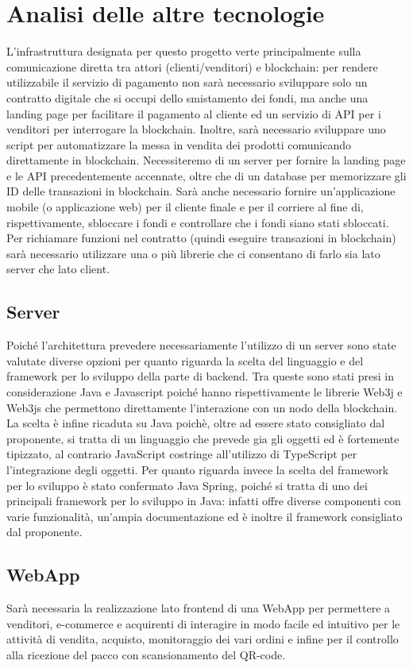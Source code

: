 \documentclass[a4paper, 12pt]{article}
\begin{document}
\section{Analisi delle altre tecnologie}
L'infrastruttura designata per questo progetto verte principalmente sulla comunicazione diretta tra attori (clienti/venditori) e blockchain: per rendere utilizzabile il servizio di pagamento non sarà necessario sviluppare solo un contratto digitale che si occupi dello smistamento dei fondi, ma anche una landing page per facilitare il pagamento al cliente ed un servizio di API per i venditori per interrogare la blockchain.
Inoltre, sarà necessario sviluppare uno script per automatizzare la messa in vendita dei prodotti comunicando direttamente in blockchain.
Necessiteremo di un server per fornire la landing page e le API precedentemente accennate, oltre che di un database per memorizzare gli ID delle transazioni in blockchain.
Sarà anche necessario fornire un'applicazione mobile (o applicazione web) per il cliente finale e per il corriere al fine di, rispettivamente, sbloccare i fondi e controllare che i fondi siano stati sbloccati.
Per richiamare funzioni nel contratto (quindi eseguire transazioni in blockchain) sarà necessario utilizzare una o più librerie che ci consentano di farlo sia lato server che lato client.
\subsection*{Server}
Poiché l'architettura prevedere necessariamente l'utilizzo di un server sono state valutate diverse opzioni per quanto riguarda la scelta del linguaggio e del framework per lo sviluppo della parte di backend. Tra queste sono stati presi in considerazione Java e Javascript poiché hanno rispettivamente le librerie Web3j e Web3js che permettono direttamente l'interazione con un nodo della blockchain. La scelta è infine ricaduta su Java poichè, oltre ad essere stato consigliato dal proponente, si tratta di un linguaggio che prevede gia gli oggetti ed è fortemente tipizzato, al contrario JavaScript costringe all'utilizzo di TypeScript per l'integrazione degli oggetti.
Per quanto riguarda invece la scelta del framework per lo sviluppo è stato confermato Java Spring, poiché si tratta di uno dei principali framework per lo sviluppo in Java: infatti offre diverse componenti con varie funzionalità, un'ampia  documentazione ed è inoltre il framework consigliato dal proponente.
\subsection*{WebApp}
Sarà necessaria la realizzazione lato frontend di una WebApp per permettere a venditori, e-commerce e acquirenti di interagire in modo facile ed intuitivo per le attività di vendita, acquisto, monitoraggio dei vari ordini e infine per il controllo alla ricezione del pacco con scansionamento del QR-code.
\end{document}
